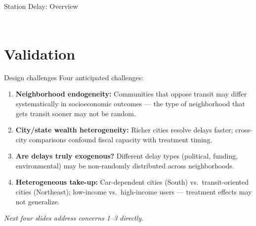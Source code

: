 \documentclass{beamer}
\begin{document}
\begin{frame}{Station Delay: Overview}
\label{slide:datastats}
\begin{columns}[T]
  \begin{column}{\textwidth}
    \vspace{0.5em}
      
    \bigskip
    \hyperlink{app:delay_by_system}{}
  \end{column}
  \end{columns}
\end{frame}


\section{Validation}

\begin{frame}{Design challenges}
\small
Four anticipated challenges:

\begin{enumerate}
  \item \textbf{Neighborhood endogeneity:} Communities that oppose transit may differ
        systematically in socioeconomic outcomes --- the type of neighborhood
        that gets transit sooner may not be random.
  \item \textbf{City/state wealth heterogeneity:} Richer cities resolve delays faster;
        cross-city comparisons confound fiscal capacity with treatment timing.
  \item \textbf{Are delays truly exogenous?} Different delay types (political, funding,
        environmental) may be non-randomly distributed across neighborhoods.
  \item \textbf{Heterogeneous take-up:} Car-dependent cities (South) vs.\
        transit-oriented cities (Northeast); low-income vs.\ high-income users ---
        treatment effects may not generalize.
\end{enumerate}

\bigskip
\textit{Next four slides address concerns 1--3 directly.}
\end{frame}
\end{document}
